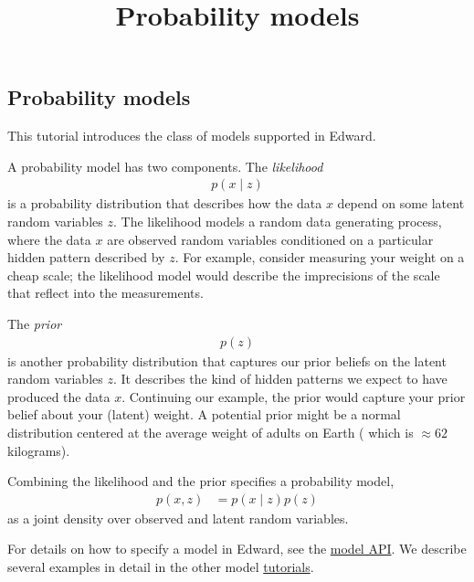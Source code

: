 \title{Probability models}

\subsection{Probability models}

This tutorial introduces the class of models supported in Edward.


A probability model has two components. The \emph{likelihood}
\begin{align*}
  p(x \mid z)
\end{align*}
is a probability distribution that describes how the data $x$ depend on some
latent random variables $z$. The likelihood models a random data generating
process, where the data $x$ are observed random variables conditioned on a
particular hidden pattern described by $z$. For example, consider measuring your
weight on a cheap scale; the likelihood model would describe the imprecisions
of the scale that reflect into the measurements.

The \emph{prior}
\begin{align*}
  p(z)
\end{align*}
is another probability distribution that captures our prior beliefs on
the latent random variables $z$. It describes the kind of hidden patterns we
expect to have produced the data $x$. Continuing our example, the prior would
capture your prior belief about your (latent) weight. A potential prior might be
a normal distribution centered at the average weight of adults on Earth (
which is $\approx62$ kilograms).

Combining the likelihood and the prior specifies a probability model,
\begin{align*}
  p(x,z)
  &=
  p(x \mid z)
  p(z)
\end{align*}
as a joint density over observed and latent random variables.

For details on how to specify a model in Edward, see the
\href{#}{model API}. We describe several examples in detail in the
other model \href{tutorials.html}{tutorials}.
